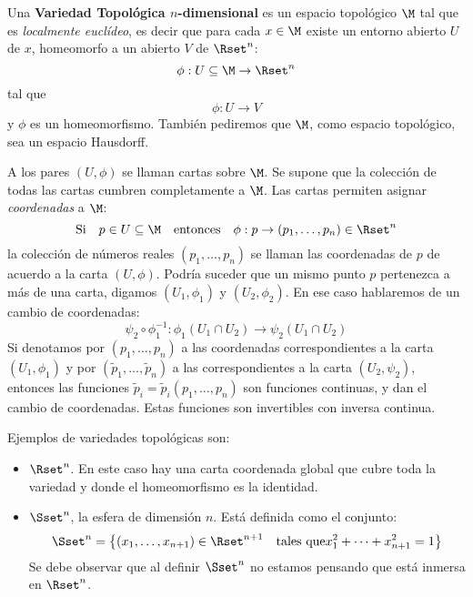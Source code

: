 \begin{definicion}
  Una  {\bf Variedad  Topol\'ogica $n$-dimensional}  es un  espacio topol\'ogico
  $\M$ tal que es {\it localmente eucl\'ideo}, es decir que para cada $x \in \M$
  existe  un  entorno  abierto $U$  de  $x$,  homeomorfo  a  un abierto  $V$  de
  $\Rset^n$:
  \[
  \phi: U \subseteq \M \rightarrow \Rset^n
  \]
  tal que
  \[
  \phi:U \rightarrow V
  \]
  y $\phi$ es un homeomorfismo.  Tambi\'en pediremos que $\M$, como espacio
  topol\'ogico, sea un espacio Hausdorff.
\end{definicion}
%
A los pares $(U,\phi)$ se llaman cartas sobre $\M$. Se supone que la colecci\'on
de todas  las cartas cumbren completamente  a $\M$. Las  cartas permiten asignar
{\it coordenadas} a $\M$:
%
\[
\mbox{Si}  \quad  p \in  U  \subseteq \M  \quad  \mbox{entonces}  \quad \phi:  p
\rightarrow (p_1 , \ldots , p_n) \in \Rset^n
\]
%
la  colecci\'on  de n\'umeros  reales  $(p_1  , \ldots  ,  p_n)$  se llaman  las
coordenadas de  $p$ de acuerdo  a la carta  $(U,\phi)$. Podr\'ia suceder  que un
mismo punto $p$ pertenezca a m\'as de una carta, digamos $(U_1,\phi_1)$ y $(U_2,
\phi_2)$. En ese caso hablaremos de un cambio de coordenadas:
%
\begin{equation}\label{cc}
\psi_2 \circ \phi_1^{-1}: \phi_1(U_1 \cap U_2) \rightarrow \psi_2(U_1 \cap U_2)
\end{equation}
%
Si denotamos por $(p_1 , \ldots  , p_n)$ a las coordenadas correspondientes a la
carta  $(U_1,\phi_1)$  y  por  $(\tilde{p}_1  , \ldots  ,  \tilde{p}_n)$  a  las
correspondientes a la carta  $(U_2,\psi_2)$, entonces las funciones $\tilde{p}_i
= \tilde{p}_i(p_1 ,  \ldots , p_n)$ son funciones continuas, y  dan el cambio de
coordenadas. Estas funciones son invertibles con inversa continua.

Ejemplos de variedades topol\'ogicas son:

\begin{itemize}
\item $\Rset^n$. En este caso hay  una carta coordenada global que cubre toda la
  variedad y donde el homeomorfismo es la identidad.
%
\item $\Sset^n$, la esfera de dimensi\'on $n$. Est\'a definida como el conjunto:
  \[
  \Sset^n = \left\{  (x_1 , \ldots , x_{n+1})  \in \Rset^{n+1} \quad \mbox{tales
      que} x_1^2 + \cdots + x_{n+1}^2 = 1 \right\}
  \]
  Se debe observar  que al definir $\Sset^n$ no estamos  pensando que est\'a inmersa
  en $\Rset^n$.
\end{itemize}

